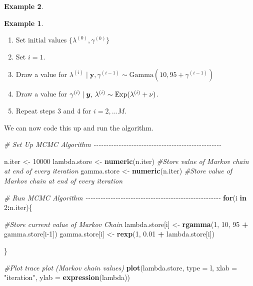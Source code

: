\documentclass[
]{book}
\newenvironment{Shaded}{\begin{snugshade}}{\end{snugshade}}
\newcommand{\AttributeTok}[1]{\textcolor[rgb]{0.13,0.29,0.53}{#1}}
\newcommand{\CommentTok}[1]{\textcolor[rgb]{0.56,0.35,0.01}{\textit{#1}}}
\newcommand{\ControlFlowTok}[1]{\textcolor[rgb]{0.13,0.29,0.53}{\textbf{#1}}}
\newcommand{\DecValTok}[1]{\textcolor[rgb]{0.00,0.00,0.81}{#1}}
\newcommand{\FloatTok}[1]{\textcolor[rgb]{0.00,0.00,0.81}{#1}}
\newcommand{\FunctionTok}[1]{\textcolor[rgb]{0.13,0.29,0.53}{\textbf{#1}}}
\newcommand{\NormalTok}[1]{#1}
\newcommand{\OtherTok}[1]{\textcolor[rgb]{0.56,0.35,0.01}{#1}}
\newcommand{\SpecialCharTok}[1]{\textcolor[rgb]{0.81,0.36,0.00}{\textbf{#1}}}
\newcommand{\StringTok}[1]{\textcolor[rgb]{0.31,0.60,0.02}{#1}}
\theoremstyle{definition}
\theoremstyle{definition}
\newtheorem{example}{Example}[chapter]
\theoremstyle{definition}
\theoremstyle{definition}
\theoremstyle{remark}
\begin{document}
\begin{example}
\begin{example}
\begin{enumerate}
\def\labelenumi{\arabic{enumi}.}
\item
  Set initial values \(\{\lambda^{(0)}, \gamma^{(0)}\}\)
\item
  Set \(i = 1\).
\item
  Draw a value for \(\lambda^{(i)} \mid \boldsymbol{y}, \gamma^{(i-1)} \sim \textrm{Gamma}(10, 95 + \gamma^{(i-1)})\)
\item
  Draw a value for \(\gamma^{(i)} \mid \boldsymbol{y}, \,\lambda^{(i)} \sim \hbox{Exp}(\lambda^{(i)} + \nu)\).
\item
  Repeat steps 3 and 4 for \(i = 2, \ldots M\).
\end{enumerate}

We can now code this up and run the algorithm.

\begin{Shaded}
\begin{Highlighting}[]
\CommentTok{\# Set Up MCMC Algorithm {-}{-}{-}{-}{-}{-}{-}{-}{-}{-}{-}{-}{-}{-}{-}{-}{-}{-}{-}{-}{-}{-}{-}{-}{-}{-}{-}{-}{-}{-}{-}{-}{-}{-}{-}{-}{-}{-}{-}{-}{-}{-}{-}{-}{-}{-}{-}{-}{-}{-}{-}}

\NormalTok{n.iter }\OtherTok{\textless{}{-}} \DecValTok{10000}
\NormalTok{lambda.store }\OtherTok{\textless{}{-}} \FunctionTok{numeric}\NormalTok{(n.iter) }\CommentTok{\#Store value of Markov chain at end of every iteration}
\NormalTok{gamma.store }\OtherTok{\textless{}{-}} \FunctionTok{numeric}\NormalTok{(n.iter) }\CommentTok{\#Store value of Markov chain at end of every iteration}



\CommentTok{\# Run MCMC Algorithm {-}{-}{-}{-}{-}{-}{-}{-}{-}{-}{-}{-}{-}{-}{-}{-}{-}{-}{-}{-}{-}{-}{-}{-}{-}{-}{-}{-}{-}{-}{-}{-}{-}{-}{-}{-}{-}{-}{-}{-}{-}{-}{-}{-}{-}{-}{-}{-}{-}{-}{-}{-}{-}{-}}
\ControlFlowTok{for}\NormalTok{(i }\ControlFlowTok{in} \DecValTok{2}\SpecialCharTok{:}\NormalTok{n.iter)\{}
  
  \CommentTok{\#Store current value of Markov Chain}
\NormalTok{  lambda.store[i] }\OtherTok{\textless{}{-}} \FunctionTok{rgamma}\NormalTok{(}\DecValTok{1}\NormalTok{, }\DecValTok{10}\NormalTok{, }\DecValTok{95} \SpecialCharTok{+}\NormalTok{ gamma.store[i}\DecValTok{{-}1}\NormalTok{])}
\NormalTok{  gamma.store[i]  }\OtherTok{\textless{}{-}} \FunctionTok{rexp}\NormalTok{(}\DecValTok{1}\NormalTok{, }\FloatTok{0.01} \SpecialCharTok{+}\NormalTok{ lambda.store[i])}
  
\NormalTok{\}}

\CommentTok{\#Plot trace plot (Markov chain values)}
\FunctionTok{plot}\NormalTok{(lambda.store, }\AttributeTok{type =} \StringTok{\textquotesingle{}l\textquotesingle{}}\NormalTok{, }\AttributeTok{xlab =} \StringTok{"iteration"}\NormalTok{, }\AttributeTok{ylab =} \FunctionTok{expression}\NormalTok{(lambda))}
\end{Highlighting}
\end{Shaded}


\end{example}
\end{example}
\end{document}
